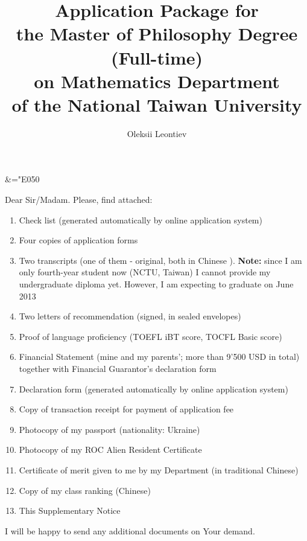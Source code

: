 \documentclass[8pt]{article} %
\title{Application Package for\\the Master of Philosophy Degree (Full-time)\\ on Mathematics Department \\of the National Taiwan University}
\author{Oleksii Leontiev}
\begin{document}
\maketitle

\sectionfont{\mdseries\upshape\Large} %
\subsectionfont{\mdseries\scshape\normalsize} %
\subsubsectionfont{\mdseries\upshape\large} %
\chardef\&="E050 %

Dear Sir/Madam. Please, find attached:
\begin{enumerate}
	\item{Check list (generated automatically by online application system)}
	\item{Four copies of application forms}
	\item{Two transcripts (one of them - original, both in Chinese
	). \textbf{Note:} since I am only fourth-year student now (NCTU, Taiwan) I cannot
	provide my undergraduate diploma yet. However, I am expecting to graduate on June 2013}
	\item{Two letters of recommendation (signed, in sealed envelopes)}
	\item{Proof of language proficiency (TOEFL iBT score, TOCFL Basic score)}
	\item{Financial Statement (mine and my parents'; more than 9'500 USD in total) together with Financial Guarantor's declaration form}
	\item{Declaration form (generated automatically by online application system)}
	\item{Copy of transaction receipt for payment of application fee}
	\item{Photocopy of my passport (nationality: Ukraine)}
	\item{Photocopy of my ROC Alien Resident Certificate}
	\item{Certificate of merit given to me by my Department (in traditional Chinese)}
	\item{Copy of my class ranking (Chinese)}
	\item{This Supplementary Notice}
\end{enumerate}
I will be happy to send any additional documents on Your demand.
\end{document}
